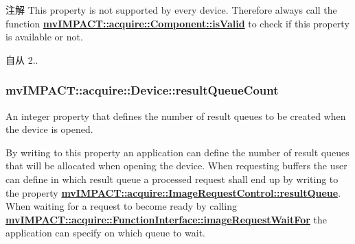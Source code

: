 \begin{DoxyNote}{注解}
This property is not supported by every device. Therefore always call the function {\bfseries \hyperlink{classmv_i_m_p_a_c_t_1_1acquire_1_1_component_ac51e55e7e046101f3c6119d84123abd5}{mv\+I\+M\+P\+A\+C\+T\+::acquire\+::\+Component\+::is\+Valid}} to check if this property is available or not.
\end{DoxyNote}
\begin{DoxySince}{自从}
2.. 
\end{DoxySince}
\hypertarget{classmv_i_m_p_a_c_t_1_1acquire_1_1_device_a93878aa300a8cff3dc3c4ef84d5d4276}{
\subsubsection[{result\+Queue\+Count}]{ mv\+I\+M\+P\+A\+C\+T\+::acquire\+::\+Device\+::result\+Queue\+Count}}\label{classmv_i_m_p_a_c_t_1_1acquire_1_1_device_a93878aa300a8cff3dc3c4ef84d5d4276}


An integer property that defines the number of result queues to be created when the device is opened. 

By writing to this property an application can define the number of result queues that will be allocated when opening the device. When requesting buffers the user can define in which result queue a processed request shall end up by writing to the property {\bfseries \hyperlink{classmv_i_m_p_a_c_t_1_1acquire_1_1_image_request_control_a9a5ed0f41db0291bc13ebe37e09fb84d}{mv\+I\+M\+P\+A\+C\+T\+::acquire\+::\+Image\+Request\+Control\+::result\+Queue}}. When waiting for a request to become ready by calling {\bfseries \hyperlink{classmv_i_m_p_a_c_t_1_1acquire_1_1_function_interface_a4cefdfda8e8940736ae9a4c97b6de8c9}{mv\+I\+M\+P\+A\+C\+T\+::acquire\+::\+Function\+Interface\+::image\+Request\+Wait\+For}} the application can specify on which queue to wait.

